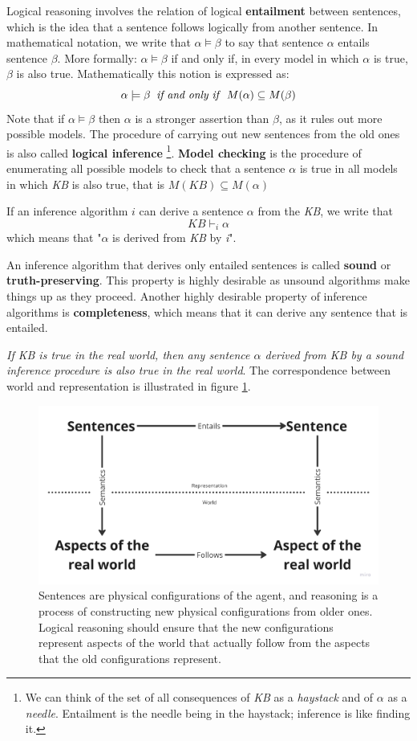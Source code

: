 \documentclass{article}
\begin{document}
Logical reasoning involves the relation of logical \textbf{entailment} between sentences, which is the idea that a sentence follows logically from another sentence. In mathematical notation, we write that $\alpha\models\beta$ to say that sentence $\alpha$ entails sentence $\beta$. More formally: $\alpha\models\beta$ if and only if, in every model in which $\alpha$ is true, $\beta$ is also true. Mathematically this notion is expressed as:
\[\alpha \models \beta \;\; \text{\textit{if and only if}} \;\; M(\alpha) \subseteq M(\beta)\]
Note that if $\alpha \models \beta $ then $\alpha$ is a stronger assertion than $\beta$, as it rules out more possible models. The procedure of carrying out new sentences from the old ones is also called \textbf{logical inference} \footnote{We can think of the set of all consequences of \textit{KB} as a \textit{haystack} and of $\alpha$ as a \textit{needle}. Entailment is the needle being in the haystack; inference is like finding it.}. \textbf{Model checking} is the procedure of enumerating all possible models to check that a sentence $\alpha$ is true in all models in which \textit{KB} is also true, that is $M(KB)\subseteq M(\alpha)$


If an inference algorithm $i$ can derive a sentence $\alpha$ from the \textit{KB}, we write that
    \[KB \vdash_i\alpha\]
which means that "$\alpha$ is derived from \textit{KB} by \textit{i}".

An inference algorithm that derives only entailed sentences is called \textbf{sound} or \textbf{truth-preserving}. This property is highly desirable as unsound algorithms make things up as they proceed. 
Another highly desirable property of inference algorithms is \textbf{completeness}, which means that it can derive any sentence that is entailed.

\textit{If KB is true in the real world, then any sentence $\alpha$ derived from KB by a sound inference procedure is also true in the real world}. The correspondence between world and representation is illustrated in figure \ref{fig:Representation vs. Real world}.

\begin{figure}
    \centering
    \includegraphics[width=0.75\linewidth]{images/Representation and Real World.png}
    \caption{Sentences are physical configurations of the agent, and reasoning is a process of constructing new physical configurations from older ones. Logical reasoning should ensure that the new configurations represent aspects of the world that actually follow from the aspects that the old configurations represent.}
    \label{fig:Representation vs. Real world}
\end{figure}
\end{document}
